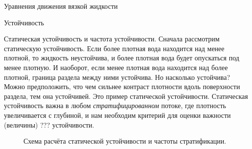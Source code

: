 \begin{chapter}{Уравнения движения вязкой жидкости}
\begin{section}{Устойчивость}
\begin{paragraph}{Статическая устойчивость и частота устойчивости.}
Сначала рассмотрим статическую устойчивость. Если более плотная вода
находится над менее плотной, то жидкость неустойчива, и более плотная
вода будет опускаться под менее плотную. И наоборот, если менее
плотная вода находится над более плотной, граница раздела между ними
устойчива. Но насколько устойчива? Можно предположить, что чем сильнее
контраст плотности вдоль поверхности раздела, тем она устойчивей. Это
пример статической устойчивости. Статическая устойчивость важна в
любом \emph{стратифицированном} потоке, где плотность увеличивается с
глубиной, и нам необходим критерий для оценки важности (величины) ???
устойчивости.
%

\begin{figure}[b!]
\caption{Схема расчёта статической устойчивости и частоты стратификации.}
\label{fig:stabilitysketch}
\end{figure}
%
%


\end{paragraph}
\end{section}
\end{chapter}
